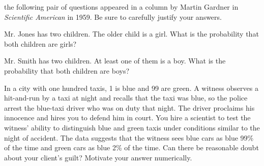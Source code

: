 \documentclass[a4paper,10pt,landscape,twocolumn]{scrartcl}
\begin{document}
\begin{exercise}
	the following pair of questions appeared in a column by Martin Gardner in \emph{Scientific American} in 1959. 	Be sure to carefully justify your answers.
	
	\begin{subex}
	Mr. Jones has two children. The older child is a girl. What is the probability that both children are girls?
	\end{subex}
	
	\begin{subex}
	Mr. Smith has two children. At least one of them is a boy. What is the probability that both children are boys?
	\end{subex}
	
\end{exercise}

\begin{exercise}[Taxi's]
	In a city with one hundred taxis, 1 is blue and 99 are green. A witness observes a hit-and-run by a taxi at night and recalls that the taxi was blue, so the police arrest the blue-taxi driver who was on duty that night. The driver proclaims his innocence and hires you to defend him in court. You hire a scientist to test the witness' ability to distinguish blue and green taxis under conditions similar to the night of accident. The data suggests that the witness sees blue cars as blue 99\% of the time and green cars as blue 2\% of the time. Can there be reasonable doubt about your client's guilt? Motivate your answer numerically.
\end{exercise}
\end{document}
